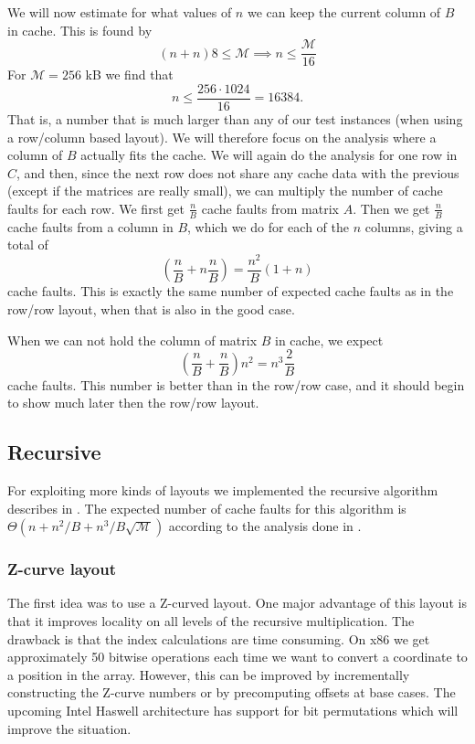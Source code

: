 We will now estimate for what values of $n$ we can keep the current
column of $B$ in cache. This is found by
\[
(n + n)8 \leq \mathcal{M} \implies n \leq \frac{\mathcal{M}}{16}
\]
For $\mathcal{M} = 256$ kB we find that
\[
n \leq \frac{256 \cdot 1024}{16} = 16384.
\]
That is, a number that is much larger than any of our test instances
(when using a row/column based layout). We will therefore focus on the
analysis where a column of $B$ actually fits the cache. We will again
do the analysis for one row in $C$, and then, since the next row does
not share any cache data with the previous (except if the matrices are
really small), we can multiply the number of cache faults for each
row. We first get $\frac{n}{B}$ cache faults from matrix $A$. Then we
get $\frac{n}{B}$ cache faults from a column in $B$, which we do for
each of the $n$ columns, giving a total of
\[
\left( \frac{n}{B} + n \frac{n}{B} \right) = \frac{n^2}{B}\left(1 + n \right)
\]
cache faults. This is exactly the same number of expected cache faults
as in the row/row layout, when that is also in the good case.

When we can not hold the column of matrix $B$ in cache, we expect
\[
\left( \frac{n}{B} + \frac{n}{B} \right) n^2 = n^3\frac{2}{B}
\]
cache faults. This number is better than in the row/row case, and it
should begin to show much later then the row/row layout.

\subsection{Recursive}

For exploiting more kinds of layouts we implemented the recursive algorithm describes in \citep{Frigo}. The expected number of cache faults for this algorithm is $\Theta(n+n^2/B + n^3/B\sqrt{\mathcal{M}})$ according to the analysis done in \cite{Frigo}.

\subsubsection{Z-curve layout}

The first idea was to use a Z-curved layout. One major advantage of this layout is that it improves locality on all levels of the recursive multiplication. The drawback is that the index calculations are time consuming. On x86 we get approximately 50 bitwise operations each time we want to convert a coordinate to a position in the array. However, this can be improved by incrementally constructing the Z-curve numbers or by precomputing offsets at base cases. The upcoming Intel Haswell architecture has support for bit permutations which will improve the situation.

